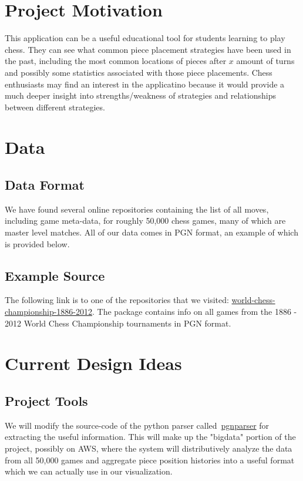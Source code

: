 \documentclass[a4paper,10pt,oneside,leqno,titlepage,onecolumn]{article}
\begin{document}
\section*{Project Motivation}
This application can be a useful educational tool for students learning to play chess. 
They can see what common piece placement strategies have been used in the past, 
including the most common locations of pieces after $x$ amount of turns and possibly 
some statistics associated with those piece placements. Chess enthusiasts may find an 
interest in the applicatino because it would provide a much deeper insight into 
strengths/weakness of strategies and relationships between different strategies.

\section*{Data}
\subsection{Data Format}
We have found several online repositories containing the list of all moves, including 
game meta-data, for roughly 50,000 chess games, many of which are master level matches. 
All of our data comes in PGN format, an example of which is provided below.


\subsection{Example Source}
The following link is to one of the repositories that we visited: \href{http://
www.chess.com/download/view/world-chess-championship-1886-2012}{world-chess-
championship-1886-2012}. The package contains info on all games from the 1886 - 2012 
World Chess Championship tournaments in PGN format. 

\section{Current Design Ideas}
\subsection{Project Tools}
We will modify the source-code of the python parser called~\href{https://
pypi.python.org/pypi/pgnparser/1.0}{pgnparser} for extracting the useful information.
This will make up the "bigdata" portion of the project, possibly on AWS, where the 
system will distributively analyze the data from all 50,000 games and aggregate piece position histories into a useful format which we can actually use in our visualization.
\end{document}
